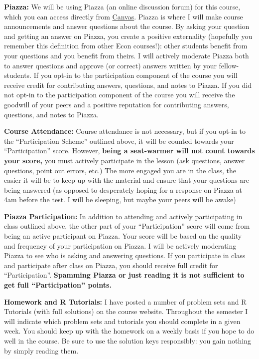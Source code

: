 \documentclass[11pt, letterpaper]{article}
\begin{document}
\noindent \textbf{Piazza:} 
We will be using Piazza (an online discussion forum) for this course, which you can access directly from \href{http://upenn.instructure.com}{Canvas}. 
Piazza is where I will make course announcements and answer questions about the course.
By asking your question and getting an answer on Piazza, you create a positive externality (hopefully you remember this definition from other Econ courses!): other students benefit from your questions and you benefit from theirs. 
I will actively moderate Piazza both to answer questions and approve (or correct) answers written by your fellow-students.
If you opt-in to the participation component of the course you will receive credit for contributing answers, questions, and notes to Piazza. 
If you did not opt-in to the participation component of the course you will receive the goodwill of your peers and a positive reputation for contributing answers, questions, and notes to Piazza. 

\medskip

\noindent \textbf{Course Attendance:}
Course attendance is not necessary, but if you opt-in to the ``Participation Scheme'' outlined above, it will be counted towards your ``Participation'' score. 
However, \textbf{being a seat-warmer will not count towards your score,} you must actively participate in the lesson (ask questions, answer questions, point out errors, etc.)
The more engaged you are in the class, the easier it will be to keep up with the material and ensure that your questions are being answered (as opposed to desperately hoping for a response on Piazza at 4am before the test. I will be sleeping, but maybe your peers will be awake)

\medskip

\noindent \textbf{Piazza Participation:}
In addition to attending and actively participating in class outlined above, the other part of your ``Participation'' score will come from being an active participant on Piazza. Your score will be based on the quality and frequency of your participation on Piazza. I will be actively moderating Piazza to see who is asking and answering questions. If you participate in class and participate after class on Piazza, you should receive full credit for ``Participation''. \textbf{Spamming Piazza or just reading it is not sufficient to get full ``Participation'' points.}

\medskip 

\noindent \textbf{Homework and R Tutorials:} 
I have posted a number of problem sets and R Tutorials (with full solutions) on the course website.
Throughout the semester I will indicate which problem sets and tutorials you should complete in a given week.
You should keep up with the homework on a weekly basis if you hope to do well in the course.
Be sure to use the solution keys responsibly: you gain nothing by simply reading them.
\end{document}
